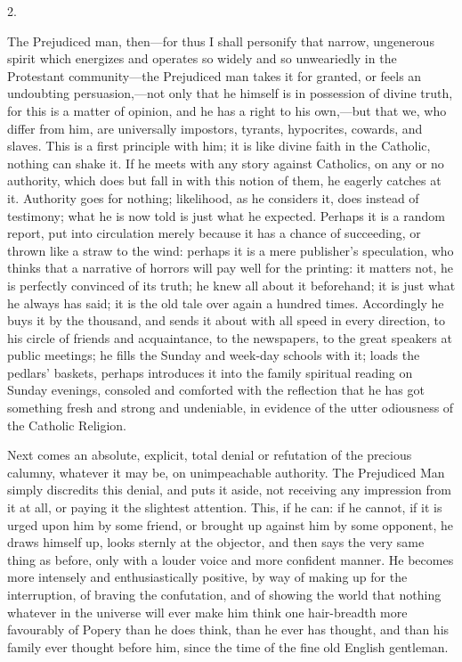 2.

The Prejudiced man, then—for thus I shall
personify that narrow, ungenerous spirit which energizes
and operates so widely and so unweariedly in the
Protestant community—the Prejudiced man takes it for
granted, or feels an undoubting persuasion,—not only
that he himself is in possession of divine truth, for
this is a matter of opinion, and he has a right to his
own,—but that we, who differ from him, are
universally impostors, tyrants, hypocrites, cowards, and
slaves. This is a first principle with him; it is like
divine faith in the Catholic, nothing can shake it. If he
meets with any story against Catholics, on any or no
authority, which does but fall in with this notion of
them, he eagerly catches at it. Authority goes for
nothing; likelihood, as he considers it, does instead of
testimony; what he is now told is just what he expected.
Perhaps it is a random report, put into circulation
merely because it has a chance of succeeding, or thrown
like a straw to the wind: perhaps it is a mere
publisher's speculation, who thinks that a narrative of
horrors will pay well for the printing: it matters not,
he is perfectly convinced of its truth; he knew all about
it beforehand; it is just what he always has said; it is
the old tale over again a hundred times. Accordingly he
buys it by the thousand, and sends it about with all
speed in every direction, to his circle of friends and
acquaintance, to the newspapers, to the great speakers at
public meetings; he fills the Sunday and week-day schools
with it; loads the pedlars' baskets, perhaps introduces
it into the family spiritual reading on Sunday evenings,
consoled and comforted with the reflection that he has
got something fresh and strong and undeniable, in
evidence of the utter odiousness of the Catholic
Religion.

Next comes an absolute, explicit, total denial or
refutation of the precious calumny, whatever it may be,
on unimpeachable authority. The Prejudiced Man simply
discredits this denial, and puts it aside, not receiving
any impression from it at all, or paying it the slightest
attention. This, if he can: if he cannot, if it is urged
upon him by some friend, or brought up against him by
some opponent, he draws himself up, looks sternly at the
objector, and then says the very same thing as before,
only with a louder voice and more confident manner. He
becomes more intensely and enthusiastically positive, by
way of making up for the interruption, of braving the
confutation, and of showing the world that nothing
whatever in the universe will ever make him think one
hair-breadth more favourably of Popery than he does
think, than he ever has thought, and than his family ever
thought before him, since the time of the fine old
English gentleman.

